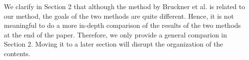 \documentclass[10pt]{article}
\begin{document}
   {\color{blue}We clarify in Section 2 that although the method by Bruckner et al.
	   is related to our method, the goals of the two methods are quite different.
	   Hence, it is not meaningful to do a more in-depth comparison of the results
	   of the two methods at the end of the paper. Therefore, we only provide
	   a general comparion in Section 2. Moving it to a later section will
   disrupt the organization of the contents.}
\end{document}
